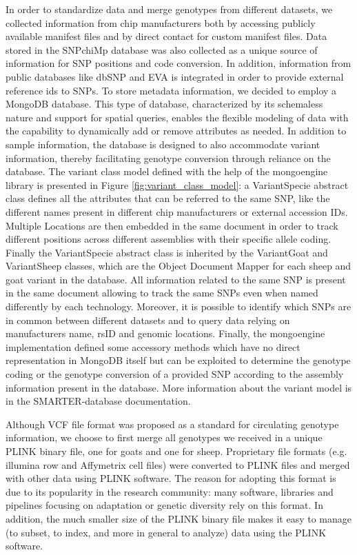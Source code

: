 \documentclass[a4paper,num-refs,gigabyte]{oup-contemporary}
\begin{document}
In order to standardize data and merge genotypes from different datasets, we collected information from chip manufacturers both by accessing publicly available manifest files and by direct contact for custom manifest files. Data stored in the SNPchiMp database\citep{Nicolazzi2015b} was also collected as a unique source of information for SNP positions and code conversion. In addition, information from public databases like dbSNP\citep{Sherry1999} and EVA\citep{Cezard2022} is integrated in order to provide external reference ids to SNPs.
To store metadata information, we decided  to employ a MongoDB\citep{MongoDBURL} database. This type of database, characterized by its schemaless nature and support for spatial queries, enables the flexible modeling of data with the capability to dynamically add or remove attributes as needed. In addition to sample information, the database is designed to also accommodate variant information, thereby facilitating genotype conversion through reliance on the database. The variant class model defined with the help of the mongoengine\citep{MongoEngine} library is presented in Figure \ref{fig:variant_class_model}: a VariantSpecie abstract class defines all the attributes that can be referred to the same SNP, like the different names present in different chip manufacturers or external accession IDs. Multiple Locations are then embedded in the same document in order to track different positions across different assemblies with their specific allele coding. Finally the VariantSpecie abstract class is inherited by the VariantGoat and VariantSheep classes, which are the Object Document Mapper\citep{ODBvsORM} for each sheep and goat variant in the database. All information related to the same SNP is present in the same document allowing to track the same SNPs even when named differently by each technology. Moreover, it is possible to identify which SNPs are in common between different datasets and to query data relying on manufacturers name, rsID and genomic locations. Finally, the mongoengine implementation defined some accessory methods which have no direct representation in MongoDB itself but can be exploited to determine the genotype coding or the genotype conversion of a provided SNP according to the assembly information present in the database. More information about the variant model is in the SMARTER-database documentation\citep{SMARTERdocs}.

Although VCF\citep{Danecek2011} file format was proposed as a standard for circulating genotype information, we choose to first merge all genotypes we received in a unique PLINK binary file, one for goats and one for sheep. Proprietary file formats (e.g. illumina row and Affymetrix cell files) were converted to PLINK files and merged with other data using PLINK\citep{Purcell2007} software. The reason for adopting this format is due to its popularity in the research community: many software, libraries and pipelines focusing on adaptation or genetic diversity rely on this format. In addition, the much smaller size of the PLINK binary file makes it easy to manage (to subset, to index, and more in general to analyze) data using the PLINK software.
\end{document}

